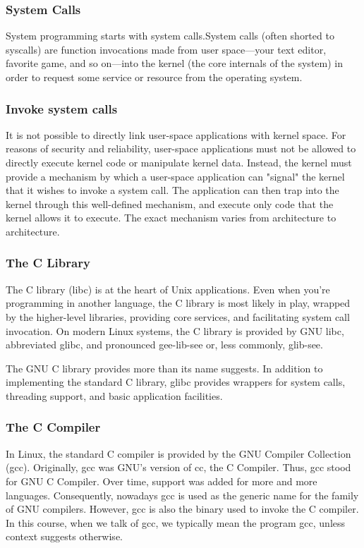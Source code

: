 \documentclass{beamer}
\begin{document}
\begin{frame}
\frametitle{System Calls}
System programming starts with system calls.System calls (often shorted to syscalls) are function invocations made from user space—your text editor, favorite game, and so on—into the kernel (the core internals of the system) in order to request some service or resource from the operating system. 
\end{frame}
\begin{frame}
\frametitle{Invoke system calls}
It is not possible to directly link user-space applications with kernel space. For reasons of security and reliability, user-space applications must not be allowed to directly execute kernel code or manipulate kernel data. Instead, the kernel must provide a mechanism by which a user-space application can "signal" the kernel that it wishes to invoke a system call. The application can then trap into the kernel through this well-defined mechanism, and execute only code that the kernel allows it to execute. The exact mechanism varies from architecture to architecture.
\end{frame}
\begin{frame}
\frametitle{The C Library}
The C library (libc) is at the heart of Unix applications. Even when you're programming in another language, the C library is most likely in play, wrapped by the higher-level libraries, providing core services, and facilitating system call invocation. On modern Linux systems, the C library is provided by GNU libc, abbreviated glibc, and pronounced gee-lib-see or, less commonly, glib-see.

The GNU C library provides more than its name suggests. In addition to implementing the standard C library, glibc provides wrappers for system calls, threading support, and basic application facilities.
\end{frame}

\begin{frame}
\frametitle{The C Compiler}
In Linux, the standard C compiler is provided by the GNU Compiler Collection (gcc). Originally, gcc was GNU's version of cc, the C Compiler. Thus, gcc stood for GNU C Compiler. Over time, support was added for more and more languages. Consequently, nowadays gcc is used as the generic name for the family of GNU compilers. However, gcc is also the binary used to invoke the C compiler. In this course, when we talk of gcc, we typically mean the program gcc, unless context suggests otherwise.

\end{frame}
\end{document}
